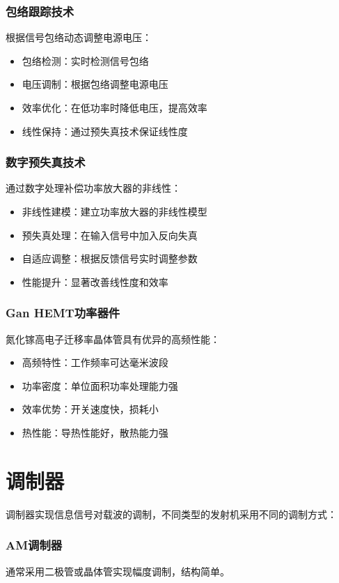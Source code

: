 \documentclass[12pt,UTF8]{ctexbook}
\begin{document}
\subsubsection{包络跟踪技术}
根据信号包络动态调整电源电压：
\begin{itemize}[leftmargin=3.5em]
    \item 包络检测：实时检测信号包络
    \item 电压调制：根据包络调整电源电压
    \item 效率优化：在低功率时降低电压，提高效率
    \item 线性保持：通过预失真技术保证线性度
\end{itemize}

\subsubsection{数字预失真技术}
通过数字处理补偿功率放大器的非线性：
\begin{itemize}[leftmargin=3.5em]
    \item 非线性建模：建立功率放大器的非线性模型
    \item 预失真处理：在输入信号中加入反向失真
    \item 自适应调整：根据反馈信号实时调整参数
    \item 性能提升：显著改善线性度和效率
\end{itemize}

\subsubsection{Gan HEMT功率器件}
氮化镓高电子迁移率晶体管具有优异的高频性能：
\begin{itemize}[leftmargin=3.5em]
    \item 高频特性：工作频率可达毫米波段
    \item 功率密度：单位面积功率处理能力强
    \item 效率优势：开关速度快，损耗小
    \item 热性能：导热性能好，散热能力强
\end{itemize}

\section{调制器}

调制器实现信息信号对载波的调制，不同类型的发射机采用不同的调制方式：

\subsubsection{AM调制器}
通常采用二极管或晶体管实现幅度调制，结构简单。
\end{document}
